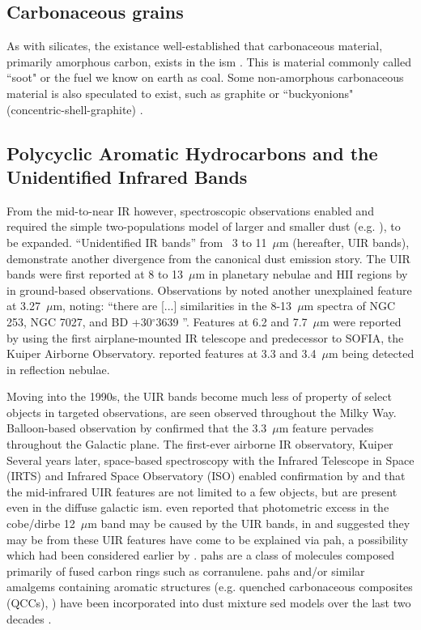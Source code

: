 \subsection{Carbonaceous grains}
      As with silicates, the existance well-established that carbonaceous material, primarily amorphous carbon, exists in the \acrshort{ism} \citep{aitken81,tielens87}. This is material commonly called ``soot" or the fuel we know on earth as coal.    Some non-amorphous carbonaceous material is also speculated to exist, such as graphite \citep{zhou06} or ``buckyonions" (concentric-shell-graphite) \citep{li08}.

\subsection{Polycyclic Aromatic Hydrocarbons and the Unidentified Infrared Bands}
    From the mid-to-near IR however, spectroscopic observations enabled and required the simple two-populations model of larger and smaller dust (e.g. \cite{mathis77}), to be expanded. ``Unidentified IR bands'' from~ 3 to 11~$\mu$m (hereafter, UIR bands), demonstrate another divergence from the canonical dust emission story. The UIR bands were first reported at 8 to 13~$\mu$m in planetary nebulae and HII regions by \cite{gillet73, gillett75} in ground-based observations. Observations by \cite{merrill75} noted another unexplained feature at 3.27~$\mu$m, noting: ``there are [...] similarities in the 8-13~$\mu$m spectra of NGC 253, NGC 7027, and BD +30$^\circ$3639 \cite{gillett75}''. Features at 6.2 and 7.7~$\mu$m were reported by \cite{russell77b} using the first airplane-mounted IR telescope and predecessor to SOFIA, the Kuiper Airborne Observatory. \cite{sellgren83} reported features at 3.3 and 3.4~$\mu$m being detected in reflection nebulae.

     Moving into the 1990s, the UIR bands become much less of property of select objects in targeted observations, are seen observed throughout the Milky Way. Balloon-based observation by \cite{giard94} confirmed that the 3.3~$\mu$m feature pervades throughout the Galactic plane. The first-ever airborne IR observatory, Kuiper Several years later, space-based spectroscopy with the Infrared Telescope in Space (IRTS)\citep{murakami96} and Infrared Space Observatory (ISO)\citep{kessler96} enabled confirmation by \cite{onaka96} and \cite{mattila96} that the mid-infrared UIR features are not limited to a few objects, but are present even in the diffuse galactic \acrshort{ism}. \cite{dwek97} even reported that photometric excess in the \acrshort{cobe}/\acrshort{dirbe} 12~$\mu$m band may be caused by the UIR bands, in and suggested they may be from these UIR features have come to be explained via \acrshort{pah}, a possibility which had been considered earlier by \cite{allamandola85,puget85}. \acrshort{pah}s are a class of molecules composed primarily of fused carbon rings such as corranulene. \acrshort{pah}s and/or similar amalgems containing aromatic structures (e.g. quenched carbonaceous composites (QCCs), \cite{sakata84}) have been incorporated into dust mixture \acrshort{sed} models over the last two decades \citep{drli01, drli07, hony01, dustem11, galliano11, jones13, jones17}.

